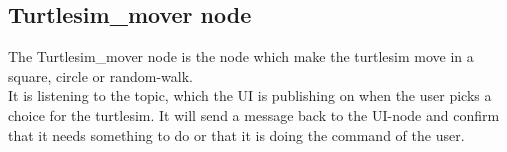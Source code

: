 \subsection{Turtlesim\_mover node}

The Turtlesim\_mover node is the node which make the turtlesim move in a square, circle or random-walk.\\
It is listening to the topic, which the UI is publishing on when the user picks a choice for the turtlesim.
It will send a message back to the UI-node and confirm that it needs something to do or that it is doing the command of the user.\\